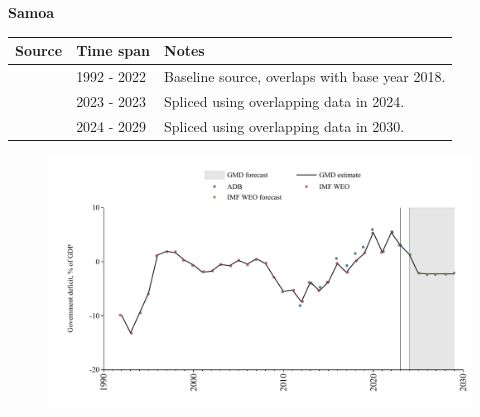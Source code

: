 \documentclass[12pt,a4paper,landscape]{article}
\begin{document}
\begin{adjustbox}{max totalsize={\paperwidth}{\paperheight},center}
\begin{minipage}[t][\textheight][t]{\textwidth}
\vspace*{0.5cm}
{}
\begin{center}
{\Large\bfseries Samoa}
\end{center}
\vspace{0.5cm}
\begin{table}[H]
\centering
\small
\begin{tabular}{|l|l|l|}
\hline
\textbf{Source} & \textbf{Time span} & \textbf{Notes} \\
\hline
\rowcolor{white}\cite{IMF_WEO}& 1992 - 2022 &Baseline source, overlaps with base year 2018.\\
\rowcolor{lightgray}\cite{ADB}& 2023 - 2023 &Spliced using overlapping data in 2024.\\
\rowcolor{white}\cite{IMF_WEO_forecast}& 2024 - 2029 &Spliced using overlapping data in 2030.\\
\hline
\end{tabular}
\end{table}
\begin{figure}[H]
\centering
\includegraphics[width=\textwidth,height=0.6\textheight,keepaspectratio]{graphs/WSM_govdef_GDP.pdf}
\end{figure}
\end{minipage}
\end{adjustbox}
\end{document}
